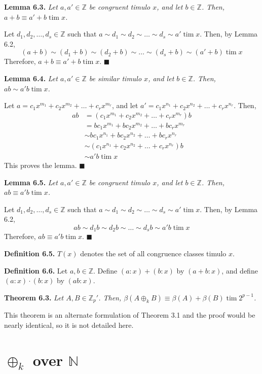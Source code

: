 \documentclass{article}
\newcommand{\tim}{\;\text{tim}\;}
\newcommand{\zee}{\mathbb{Z}}
\newcommand{\N}{\mathbb{N}}
\begin{document}
\textbf{Lemma 6.3.} \textit{Let $a, a' \in \zee$ be
congruent timulo $x$, and let $b \in \zee$. Then,
$a + b \equiv a' + b \tim x$.}

Let $d_1, d_2, \ldots, d_s \in \zee$
such that $a \sim d_1 \sim d_2 \sim \ldots \sim d_s \sim a' \tim x$.
Then, by Lemma 6.2,
\[(a + b) \sim (d_1 + b) \sim (d_2 + b) \sim \ldots
\sim (d_s + b) \sim (a' + b) \tim x\]
Therefore, $a + b \equiv a' + b \tim x$.
$\blacksquare$

\textbf{Lemma 6.4.} \textit{Let $a, a' \in \zee$ be
similar timulo $x$, and let $b \in \zee$. Then,
$ab \sim a'b \tim x$.}

Let $a = c_1x^{m_1} + c_2x^{m_2} + \ldots + c_rx^{m_r}$,
and let
$a' = c_1x^{n_1} + c_2x^{n_2} + \ldots + c_rx^{n_r}$.
Then,
\[\begin{split}
    ab &= (c_1x^{m_1} + c_2x^{m_2} + \ldots + c_rx^{m_r})b \\
    &= bc_1x^{m_1} + bc_2x^{m_2} + \ldots + bc_rx^{m_r} \\
    &\sim bc_1x^{n_1} + bc_2x^{n_2} + \ldots + bc_rx^{n_r} \\
    &\sim (c_1x^{n_1} + c_2x^{n_2} + \ldots + c_rx^{n_r})b \\
    &\sim a'b \tim x
\end{split}\]
This proves the lemma. $\blacksquare$

\textbf{Lemma 6.5.} \textit{Let $a, a' \in \zee$ be
congruent timulo $x$, and let $b \in \zee$. Then,
$ab \equiv a'b \tim x$.}

Let $d_1, d_2, \ldots, d_s \in \zee$
such that $a \sim d_1 \sim d_2 \sim \ldots \sim d_s \sim a' \tim x$.
Then, by Lemma 6.2,
\[ab \sim d_1b \sim d_2b \sim \ldots
\sim d_sb \sim a'b \tim x\]
Therefore, $ab \equiv a'b \tim x$.
$\blacksquare$

\textbf{Definition 6.5.} $T(x)$ denotes the set of all
congruence classes timulo $x$.

\textbf{Definition 6.6.} Let $a, b \in \zee$. Define
$(a:x) + (b:x)$ by $(a+b:x)$, and define $(a:x) \cdot (b:x)$
by $(ab:x)$.

\textbf{Theorem 6.3.} \textit{Let $A, B \in \zee_p'$.
Then, $\beta(A \oplus_k B) \equiv \beta(A) + \beta(B) \tim 2^{p-1}$.}

This theorem is an alternate formulation of Theorem 3.1 and the proof
would be nearly identical, so it is not detailed here.

\section{$\oplus_k$ over $\N$}
\end{document}
